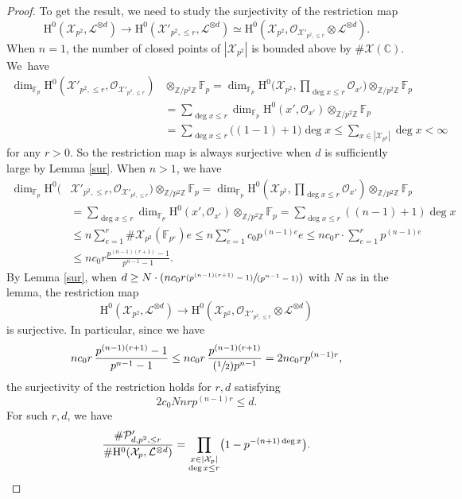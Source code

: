 \documentclass[11pt]{article}
\numberwithin{equation}{section}
\newcommand{\Psfrac}[2]{(\sfrac{#1}{#2})}
\newcommand{\pspfrac}[2]{\sfrac{(#1)}{(#2)}}
\theoremstyle{plain}
\theoremstyle{definition}
\newcommand{\ho}{\mathrm{H}}
\newcommand{\Oc}{\mathcal{O}}
\newcommand{\X}{\mathcal{X}}
\newcommand{\li}{\mathcal{L}}
\newcommand{\Z}{\mathbb{Z}}
\newcommand{\bbC}{\mathbb{C}}
\newcommand{\F}{\mathbb{F}}
\begin{document}
\begin{proof}
To get the result, we need to study the surjectivity of the restriction map\vspace*{-3pt}
\[
\ho^0(\X_{p^2}, \li^{\otimes d})\to \ho^0(\X'_{p^2,\leq r}, \li^{\otimes d})\simeq\ho^0(\X_{p^2}, \mathcal{O}_{\X'_{p^2,\leq r}}\otimes \li^{\otimes d}).
\]
When $n=1$, the number of closed points of $|\X_{p^2}|$ is bounded above by $\#\X(\bbC)$. We~have\vspace*{-3pt}
\begin{align*}
\dim_{\F_p}\ho^0(\X'_{p^2,\leq r}, \Oc_{\X'_{p^2,\leq r}})&\otimes_{\Z/p^2\Z} \F_p =\dim_{\F_p}\ho^0\bigl(\X_{p^2}, \textstyle\prod_{\deg x\leq r}\Oc_{x'}\bigr)\otimes_{\Z/p^2\Z} \F_p\\
&= \sum_{\deg x\leq r}\dim_{\F_p}\ho^0(x', \Oc_{x'})\otimes_{\Z/p^2\Z} \F_p\\
&= \sum_{\deg x\leq r} {\big((1-1)+1\big)\deg x}\leq \sum_{x\in |\X_{p^2}|}\deg x<\infty
\end{align*}
for any $r>0$. So the restriction map is always surjective when $d$ is sufficiently large by Lemma \ref{sur}.
When $n>1$, we have\vspace*{-3pt}
\begin{align*}
\dim_{\F_p}\ho^0(&\X'_{p^2,\leq r}, \Oc_{\X'_{p^2,\leq r}})\otimes_{\Z/p^2\Z} \F_p =\dim_{\F_p}\ho^0(\X_{p^2}, \textstyle\prod_{\deg x\leq r}\Oc_{x'})\otimes_{\Z/p^2\Z} \F_p\\
&= \sum_{\deg x\leq r}\dim_{\F_p}\ho^0(x', \Oc_{x'})\otimes_{\Z/p^2\Z} \F_p= \sum_{\deg x\leq r} {((n-1)+1)\deg x}\\
&\leq n \sum_{e=1}^r \#\X_{p^2}(\F_{p^e})e\leq n \sum_{e=1}^r c_0p^{(n-1)e}e\leq n c_0r\cdot \sum_{e=1}^r p^{(n-1)e}\\
&\leq n c_0r \frac{p^{(n-1)(r+1)}-1}{p^{n-1}-1}.
\end{align*}
By Lemma \ref{sur}, when $d\geq N\cdot(n c_0r\pspfrac{p^{(n-1)(r+1)}-1}{p^{n-1}-1})$ with $N$ as in the lemma, the restriction map\vspace*{-3pt}
\[
\ho^0(\X_{p^2}, \li^{\otimes d})\to \ho^0(\X_{p^2}, \mathcal{O}_{\X'_{p^2,\leq r}}\otimes \li^{\otimes d})
\]
is surjective. In particular, since we have%
\[
n c_0r\, \frac{p^{(n-1)(r+1)}-1}{p^{n-1}-1}\leq nc_0r\,\frac{p^{(n-1)(r+1)}}{\Psfrac{1}{2}p^{n-1}}=2nc_0rp^{(n-1)r},
\]
the surjectivity of the restriction holds for $r,d$ satisfying\vspace*{-3pt}
\[
2c_0Nnrp^{(n-1)r}\leq d.
\]
For such $r,d$, we have\vspace*{-3pt}
\[
\frac{\#\mathcal{P}'_{d,p^2,\leq r}}{\#\ho^0(\X_{p}, \li^{\otimes d})}=\prod_{\substack{x\in |\X_{p}|\\ \deg x\leq r}} \bigl(1-p^{-(n+1)\deg x} \bigr).\qedhere
\]
\end{proof}
\end{document}
